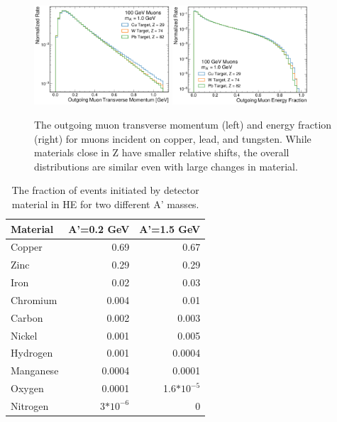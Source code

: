\begin{figure}[!htbp]
    \centering
    \includegraphics[width=0.45\textwidth]{figures/muon_material_comp_pt.pdf}
    \hspace{0.01\textwidth}
    \includegraphics[width=0.45\textwidth]{figures/muon_material_comp_efrac.pdf}
    \caption[
        Material dependence of \dbrem kinematics.
    ]{
        The outgoing muon transverse momentum (left) and energy fraction (right) for muons incident on copper, lead, and tungsten. While materials close in Z have smaller relative shifts, the overall distributions are similar even with large changes in material. 
    }
    \label{fig:dbrem_material}
\end{figure}

\begin{table}[ht]
    \centering
    \begin{center}
        \begin{tabular}{@{}l rr@{}}
            \toprule
            Material & A'=0.2 GeV & A'=1.5 GeV\\
            \midrule
            Copper&0.69&0.67\\
            Zinc&0.29&0.29\\
            Iron&0.02&0.03\\
            Chromium&0.004&0.01\\
            Carbon&0.002&0.003\\
            Nickel&0.001&0.005\\
            Hydrogen&0.001&0.0004\\
            Manganese&0.0004&0.0001\\
            Oxygen&0.0001&1.6$*10^{-5}$\\
            Nitrogen&3$*10^{-6}$&0\\
            \bottomrule
        \end{tabular}
        \caption{
            The fraction of \dbrem events initiated by detector material in HE for two different A' masses.
        }
        \label{table:dbrem_material}
    \end{center}
\end{table}
    

